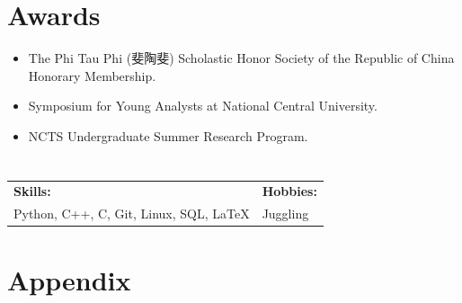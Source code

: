 \documentclass[a4paper,10pt]{article}
\newcommand{\coloredsection}[1]{\section*{\textcolor{blue!70!black}{#1}}}
\begin{document}
\coloredsection{Awards}
\begin{itemize}[leftmargin=30pt]
    \item The Phi Tau Phi (斐陶斐) Scholastic Honor Society of the Republic of China Honorary Membership.
    \item Symposium for Young Analysts at National Central University.
    \item NCTS Undergraduate Summer Research Program.
\end{itemize}

\section*{}
\begin{tabularx}{\textwidth}{X X}
    \textbf{Skills:} & \textbf{Hobbies:} \\
    Python, C++, C, Git, Linux, SQL, \LaTeX & Juggling \\
\end{tabularx}

\coloredsection{Appendix}
\end{document}
